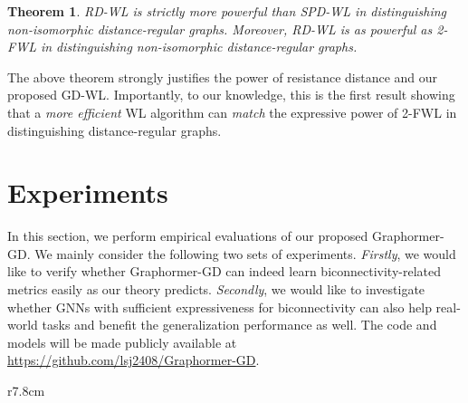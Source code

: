 \documentclass{article} %
\newtheorem{theorem}{Theorem}[section]
\begin{document}
\begin{theorem}
\label{thm:distance_regular_maintext}
    RD-WL is strictly more powerful than SPD-WL in distinguishing non-isomorphic distance-regular graphs. Moreover, RD-WL is as powerful as 2-FWL in distinguishing non-isomorphic distance-regular graphs.
\end{theorem}

The above theorem strongly justifies the power of resistance distance and our proposed GD-WL. Importantly, to our knowledge, this is the first result showing that a \emph{more efficient} WL algorithm can \emph{match} the expressive power of 2-FWL in distinguishing distance-regular graphs.

\section{Experiments}
\label{sec:experiments}

In this section, we perform empirical evaluations of our proposed Graphormer-GD. We mainly consider the following two sets of experiments. \emph{Firstly}, we would like to verify whether Graphormer-GD can indeed learn biconnectivity-related metrics easily as our theory predicts. \emph{Secondly}, we would like to investigate whether GNNs with sufficient expressiveness for biconnectivity can also help real-world tasks and benefit the generalization performance as well. The code and models will be made publicly available at \url{https://github.com/lsj2408/Graphormer-GD}.

\begin{wraptable}{r}{7.8cm}
\vspace{-20pt}
\caption{Accuracy on cut vertex (articulation point) and cut edge (bridge) detection tasks.}
  \vspace{4px}
  \label{tab:syn}
  \centering
\vspace{-8pt}
\end{wraptable}
\end{document}
